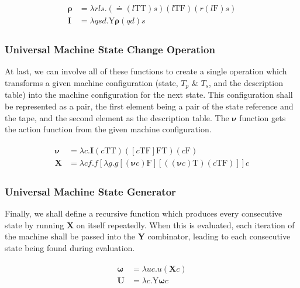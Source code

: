 \documentclass[Master.tex]{subfiles}
\begin{document}
\begin{gather*}
\begin{aligned}
\bm{\rho} &= \lambda rls.(\bm{\doteq}(l\bm{\mathrm{TT}})s)(l\bm{\mathrm{TF}})(r(l\bm{\mathrm{F}})s)\\
\bm{I} &= \lambda qsd.\bm{\mathrm{Y}\rho}(qd)s
\end{aligned}
\end{gather*}

\subsubsection{Universal Machine State Change Operation}

At last, we can involve all of these functions to create a single operation which transforms a given machine configuration (state, $T_p$ \& $T_s$, and the description table) into the machine configuration for the next state. This configuration shall be represented as a pair, the first element being a pair of the state reference and the tape, and the second element as the description table. The $\bm{\nu}$ function gets the action function from the given machine configuration.

\begin{gather*}
\begin{aligned}
\bm{\nu} &= \lambda c.\bm{I}(c\bm{\mathrm{TT}})([c\bm{\mathrm{TF}}]\bm{\mathrm{FT}})(c\bm{\mathrm{F}})\\
\bm{X} &= \lambda cf.f[\lambda g.g[(\bm{\nu}c)\bm{\mathrm{F}}][((\bm{\nu}c)\bm{\mathrm{T}})(c\bm{\mathrm{TF}})]]c
\end{aligned}
\end{gather*}

\subsubsection{Universal Machine State Generator}

Finally, we shall define a recursive function which produces every consecutive state by running $\bm{X}$ on itself repeatedly. When this is evaluated, each iteration of the machine shall be passed into the \textbf{Y} combinator, leading to each consecutive state being found during evaluation.

\begin{gather*}
\begin{aligned}
\bm{\omega} &= \lambda uc.u(\bm{X}c) \\
\bm{U} &= \lambda c.\bm{\mathrm{Y}}\bm{\omega}c
\end{aligned}
\end{gather*}
\end{document}
